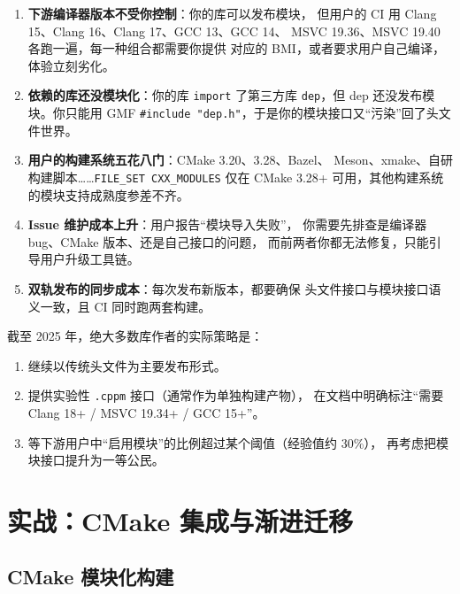 \documentclass[12pt,a4paper,fontset=fandol]{ctexbook}
\newcommand{\flag}[1]{\texttt{#1}}
\begin{document}
\begin{enumerate}
  \item \textbf{下游编译器版本不受你控制}：你的库可以发布模块，
        但用户的 CI 用 Clang 15、Clang 16、Clang 17、GCC 13、GCC 14、
        MSVC 19.36、MSVC 19.40 各跑一遍，每一种组合都需要你提供
        对应的 BMI，或者要求用户自己编译，体验立刻劣化。
  \item \textbf{依赖的库还没模块化}：你的库 \flag{import} 了第三方库
        \texttt{dep}，但 dep 还没发布模块。你只能用 GMF
        \flag{\#include "dep.h"}，于是你的模块接口又“污染”回了头文件世界。
  \item \textbf{用户的构建系统五花八门}：CMake 3.20、3.28、Bazel、
        Meson、xmake、自研构建脚本……\flag{FILE\_SET CXX\_MODULES}
        仅在 CMake 3.28+ 可用，其他构建系统的模块支持成熟度参差不齐。
  \item \textbf{Issue 维护成本上升}：用户报告“模块导入失败”，
        你需要先排查是编译器 bug、CMake 版本、还是自己接口的问题，
        而前两者你都无法修复，只能引导用户升级工具链。
  \item \textbf{双轨发布的同步成本}：每次发布新版本，都要确保
        头文件接口与模块接口语义一致，且 CI 同时跑两套构建。
\end{enumerate}

\begin{warning}[title=库作者的现实选择]
截至 2025 年，绝大多数库作者的实际策略是：
\begin{enumerate}
  \item 继续以传统头文件为主要发布形式。
  \item 提供实验性 \texttt{.cppm} 接口（通常作为单独构建产物），
        在文档中明确标注“需要 Clang 18+ / MSVC 19.34+ / GCC 15+”。
  \item 等下游用户中“启用模块”的比例超过某个阈值（经验值约 30\%），
        再考虑把模块接口提升为一等公民。
\end{enumerate}
\end{warning}

\part{实战：CMake 集成与渐进迁移}

\chapter{CMake 模块化构建}
\end{document}
